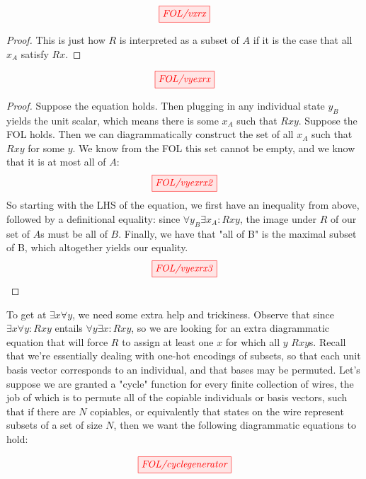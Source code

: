 \begin{fullwidth}
\begin{proposition}
\[\tikzfig{FOL/vxrx}\]
\begin{proof}
This is just how $R$ is interpreted as a subset of $A$ if it is the case that all $x_A$ satisfy $Rx$.
\end{proof}
\end{proposition}

\begin{proposition}\label{prop:allthenex}
\[\tikzfig{FOL/vyexrx}\]
\begin{proof}
Suppose the equation holds. Then plugging in any individual state $y_B$ yields the unit scalar, which means there is some $x_A$ such that $Rxy$. Suppose the FOL holds. Then we can diagrammatically construct the set of all $x_A$ such that $Rxy$ for some $y$. We know from the FOL this set cannot be empty, and we know that it is at most all of $A$:
\[\tikzfig{FOL/vyexrx2}\]
So starting with the LHS of the equation, we first have an inequality from above, followed by a definitional equality: since $\forall y_B \exists x_A : Rxy$, the image under $R$ of our set of $A$s must be all of $B$. Finally, we have that "all of B" is the maximal subset of B, which altogether yields our equality.
\[\tikzfig{FOL/vyexrx3}\]
\end{proof}
\end{proposition}

To get at $\exists x \forall y$, we need some extra help and trickiness. Observe that since $\exists x \forall y : Rxy$ entails $\forall y \exists x : Rxy$, so we are looking for an extra diagrammatic equation that will force $R$ to assign at least one $x$ for which all $y$ $Rxy$s. Recall that we're essentially dealing with one-hot encodings of subsets, so that each unit basis vector corresponds to an individual, and that bases may be permuted. Let's suppose we are granted a "cycle" function for every finite collection of wires, the job of which is to permute all of the copiable individuals or basis vectors, such that if there are $N$ copiables, or equivalently that states on the wire represent subsets of a set of size $N$, then we want the following diagrammatic equations to hold:

\[\tikzfig{FOL/cyclegenerator}\]


\end{fullwidth}
